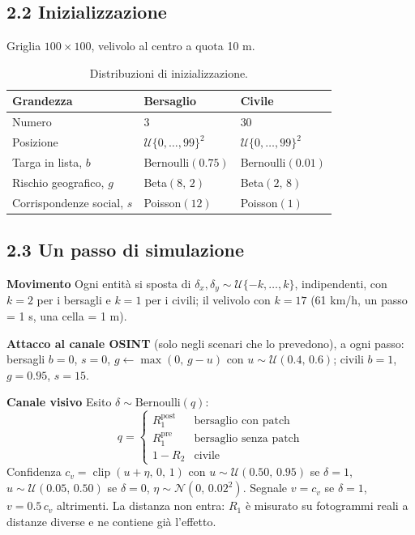 \documentclass[a4paper, 11pt]{article}
\begin{document}
\subsection*{2.2 Inizializzazione}

Griglia $100 \times 100$, velivolo al centro a quota 10 m.

\begin{table}[h]
\centering
\begin{tabular}{lll}
\toprule
\textbf{Grandezza} & \textbf{Bersaglio} & \textbf{Civile} \\
\midrule
Numero & 3 & 30 \\
Posizione & $\mathcal{U}\{0,\dots,99\}^2$ & $\mathcal{U}\{0,\dots,99\}^2$ \\
Targa in lista, $b$ & Bernoulli$(0.75)$ & Bernoulli$(0.01)$ \\
Rischio geografico, $g$ & Beta$(8,\,2)$ & Beta$(2,\,8)$ \\
Corrispondenze social, $s$ & Poisson$(12)$ & Poisson$(1)$ \\
\bottomrule
\end{tabular}
\caption{Distribuzioni di inizializzazione.}
\label{tab:init}
\end{table}

\subsection*{2.3 Un passo di simulazione}

\textbf{Movimento} Ogni entità si sposta di
$\delta_x, \delta_y \sim \mathcal{U}\{-k, \dots, k\}$, indipendenti, con
$k = 2$ per i bersagli e $k = 1$ per i civili; il velivolo con $k = 17$
(61 km/h, un passo = 1 s, una cella = 1 m).

\textbf{Attacco al canale OSINT} (solo negli scenari che lo prevedono), a ogni
passo: bersagli $b = 0$, $s = 0$, $g \leftarrow \max(0,\, g - u)$ con
$u \sim \mathcal{U}(0.4,\, 0.6)$; civili $b = 1$, $g = 0.95$, $s = 15$.

\textbf{Canale visivo} Esito $\delta \sim \text{Bernoulli}(q)$:
\[
q =
\begin{cases}
R_1^{\text{post}} & \text{bersaglio con patch} \\
R_1^{\text{pre}} & \text{bersaglio senza patch} \\
1 - R_2 & \text{civile}
\end{cases}
\]
Confidenza $c_v = \operatorname{clip}(u + \eta,\, 0,\, 1)$ con
$u \sim \mathcal{U}(0.50,\, 0.95)$ se $\delta = 1$,
$u \sim \mathcal{U}(0.05,\, 0.50)$ se $\delta = 0$,
$\eta \sim \mathcal{N}(0,\, 0.02^2)$. Segnale $v = c_v$ se $\delta = 1$,
$v = 0.5\,c_v$ altrimenti. La distanza non entra: $R_1$ è misurato su
fotogrammi reali a distanze diverse e ne contiene già l'effetto.
\end{document}
